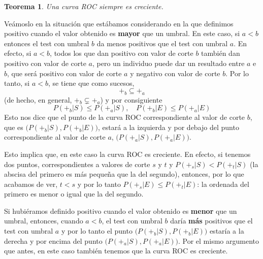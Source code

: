 \documentclass[
]{book}
\newtheorem{theorem}{Teorema}[chapter]
\theoremstyle{definition}
\theoremstyle{definition}
\theoremstyle{definition}
\theoremstyle{definition}
\theoremstyle{remark}
\begin{document}
\begin{theorem}
\protect\hypertarget{thm:unnamed-chunk-167}{}\label{thm:unnamed-chunk-167}Una curva ROC siempre es creciente.
\end{theorem}

Veámoslo en la situación que estábamos considerando en la que definimos positivo cuando el valor obtenido es \textbf{mayor} que un umbral. En este caso, si \(a<b\) entonces el test con umbral \(b\) da menos positivos que el test con umbral \(a\). En efecto, si \(a<b\), todos los que dan positivo con valor de corte \(b\) también dan positivo con valor de corte \(a\), pero un individuo puede dar un resultado entre \(a\) e \(b\), que será positivo con valor de corte \(a\) y negativo con valor de corte \(b\).
Por lo tanto, si \(a<b\), se tiene que como sucesos,
\[
+_b\subseteq +_a
\]
(de hecho, en general, \(+_b\subsetneq +_a\)) y por consiguiente
\[
P(+_b|S)\leqslant P(+_a|S),\quad P(+_b|E)\leqslant P(+_a|E)
\]
Esto nos dice que el punto de la curva ROC correspondiente al valor de corte \(b\), que es \(\big(P(+_b|S),P(+_b|E)\big)\), estará a la izquierda y por debajo del punto correspondiente al valor de corte \(a\), \(\big(P(+_a|S),P(+_a|E)\big)\).

Esto implica que, en este caso la curva ROC es creciente. En efecto, si tenemos dos puntos, correspondientes a valores de corte \(s\) y \(t\) y \(P(+_s|S)< P(+_t|S)\) (la abscisa del primero es más pequeña que la del segundo), entonces, por lo que acabamos de ver, \(t<s\) y por lo tanto \(P(+_s|E)\leqslant P(+_t|E)\): la ordenada del primero es menor o igual que la del segundo.

Si hubiéramos definido positivo cuando el valor obtenido es \textbf{menor} que un umbral, entonces, cuando \(a<b\), el test con umbral \(b\) daría \textbf{más} positivos que el test con umbral \(a\) y por lo tanto el punto \(\big(P(+_b|S),P(+_b|E)\big)\) estaría a la derecha y por encima del punto \(\big(P(+_a|S),P(+_a|E)\big)\). Por el mismo argumento que antes, en este caso también tenemos que la curva ROC es creciente.
\end{document}
